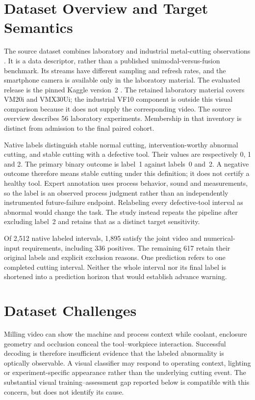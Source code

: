 \section{Dataset Overview and Target Semantics}
The source dataset combines laboratory and industrial metal-cutting observations \citep{Kim2026MSM}. It is a data descriptor, rather than a published unimodal-versus-fusion benchmark. Its streams have different sampling and refresh rates, and the smartphone camera is available only in the laboratory material. The evaluated release is the pinned Kaggle version~2 \citep{MSMKaggle2025}. The retained laboratory material covers VM20i and VMX30Ui; the industrial VF10 component is outside this visual comparison because it does not supply the corresponding video. The source overview describes 56 laboratory experiments. Membership in that inventory is distinct from admission to the final paired cohort.

Native labels distinguish stable normal cutting, intervention-worthy abnormal cutting, and stable cutting with a defective tool. Their values are respectively 0, 1 and 2. The primary binary outcome is label~1 against labels~0 and~2. A negative outcome therefore means stable cutting under this definition; it does not certify a healthy tool. Expert annotation uses process behavior, sound and measurements, so the label is an observed process judgment rather than an independently instrumented future-failure endpoint. Relabeling every defective-tool interval as abnormal would change the task. The study instead repeats the pipeline after excluding label~2 and retains that as a distinct target sensitivity.

Of 2,512 native labeled intervals, 1,895 satisfy the joint video and numerical-input requirements, including 336 positives. The remaining 617 retain their original labels and explicit exclusion reasons. One prediction refers to one completed cutting interval. Neither the whole interval nor its final label is shortened into a prediction horizon that would establish advance warning.

\section{Dataset Challenges}
Milling video can show the machine and process context while coolant, enclosure geometry and occlusion conceal the tool--workpiece interaction. Successful decoding is therefore insufficient evidence that the labeled abnormality is optically observable. A visual classifier may respond to operating context, lighting or experiment-specific appearance rather than the underlying cutting event. The substantial visual training--assessment gap reported below is compatible with this concern, but does not identify its cause.

